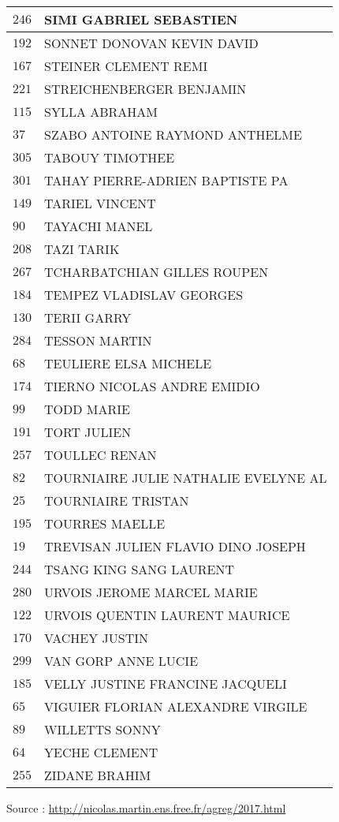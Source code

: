 \begin{xltabular}{\linewidth}{|l|X|}
    \hline
    $246$ & SIMI GABRIEL SEBASTIEN \\
    \hline
    $192$ & SONNET DONOVAN KEVIN DAVID \\
    \hline
    $167$ & STEINER CLEMENT REMI \\
    \hline
    $221$ & STREICHENBERGER BENJAMIN \\
    \hline
    $115$ & SYLLA ABRAHAM \\
    \hline
    $37$ & SZABO ANTOINE RAYMOND ANTHELME \\
    \hline
    $305$ & TABOUY TIMOTHEE \\
    \hline
    $301$ & TAHAY PIERRE-ADRIEN BAPTISTE PA \\
    \hline
    $149$ & TARIEL VINCENT \\
    \hline
    $90$ & TAYACHI MANEL \\
    \hline
    $208$ & TAZI TARIK \\
    \hline
    $267$ & TCHARBATCHIAN GILLES ROUPEN \\
    \hline
    $184$ & TEMPEZ VLADISLAV GEORGES \\
    \hline
    $130$ & TERII GARRY \\
    \hline
    $284$ & TESSON MARTIN \\
    \hline
    $68$ & TEULIERE ELSA MICHELE \\
    \hline
    $174$ & TIERNO NICOLAS ANDRE EMIDIO \\
    \hline
    $99$ & TODD MARIE \\
    \hline
    $191$ & TORT JULIEN \\
    \hline
    $257$ & TOULLEC RENAN \\
    \hline
    $82$ & TOURNIAIRE JULIE NATHALIE EVELYNE AL \\
    \hline
    $25$ & TOURNIAIRE TRISTAN \\
    \hline
    $195$ & TOURRES MAELLE \\
    \hline
    $19$ & TREVISAN JULIEN FLAVIO DINO JOSEPH \\
    \hline
    $244$ & TSANG KING SANG LAURENT \\
    \hline
    $280$ & URVOIS JEROME MARCEL MARIE \\
    \hline
    $122$ & URVOIS QUENTIN LAURENT MAURICE \\
    \hline
    $170$ & VACHEY JUSTIN \\
    \hline
    $299$ & VAN GORP ANNE LUCIE \\
    \hline
    $185$ & VELLY JUSTINE FRANCINE JACQUELI \\
    \hline
    $65$ & VIGUIER FLORIAN ALEXANDRE VIRGILE \\
    \hline
    $89$ & WILLETTS SONNY \\
    \hline
    $64$ & YECHE CLEMENT \\
    \hline
    $255$ & ZIDANE BRAHIM \\
    \hline
  \end{xltabular}

  \begin{flushright}
    {\tiny Source : \url{http://nicolas.martin.ens.free.fr/agreg/2017.html}}
  \end{flushright}

